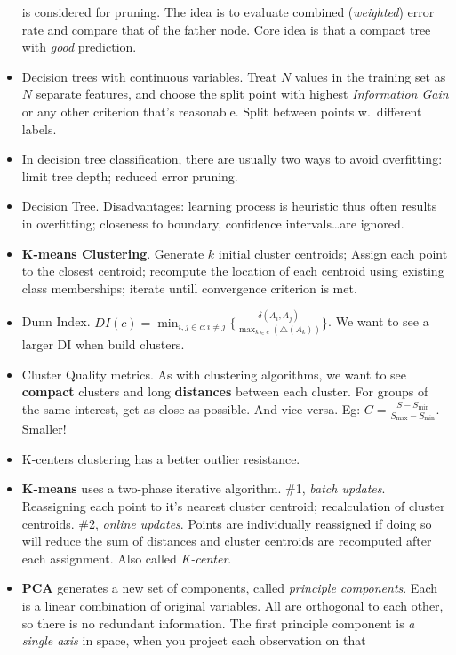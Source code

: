 \documentclass[twocolumn]{article}
\begin{document}
\begin{itemize}
  is considered for pruning. The idea is to evaluate combined
  (\emph{weighted}) error rate and compare that of the father
  node. Core idea is that a compact tree with \emph{good} prediction.
\item Decision trees with continuous variables. Treat $N$ values in
  the training set as $N$ separate features, and choose the split
  point with highest \emph{Information Gain} or any other criterion
  that's reasonable. Split between points w.\ different labels.
\item In decision tree classification, there are usually two ways to
  avoid overfitting: limit tree depth; reduced error pruning.
\item Decision Tree. Disadvantages: learning process is heuristic thus
  often results in overfitting; closeness to boundary, confidence
  intervals\ldots are ignored.
\item \textbf{K-means Clustering}. Generate $k$ initial cluster
  centroids; Assign each point to the closest centroid; recompute the
  location of each centroid using existing class memberships; iterate
  untill convergence criterion is met.
\item Dunn Index. $DI(c)=\min_{i,j\in c:i\neq j}\{\frac{\delta
    (A_{i},A_{j})}{\max_{k\in c}(\triangle (A_{k}))}\}$. We want to
  see a larger DI when build clusters.
\item Cluster Quality metrics. As with clustering algorithms, we want
  to see \textbf{compact} clusters and long \textbf{distances} between
  each cluster. For groups of the same interest, get as close as
  possible. And vice versa. Eg:
  $C=\frac{S-S_{\min}}{S_{\max}-S_{\min}}$. Smaller!
\item K-centers clustering has a better outlier resistance. 
\item \textbf{K-means} uses a two-phase iterative algorithm. \#1,
  \emph{batch updates}. Reassigning each point to it's nearest cluster
  centroid; recalculation of cluster centroids. \#2, \emph{online
    updates}. Points are individually reassigned if doing so will
  reduce the sum of distances and cluster centroids are recomputed
  after each assignment. Also called \emph{K-center}.
\item \textbf{PCA} generates a new set of components, called
  \emph{principle components}. Each is a linear combination of
  original variables. All are orthogonal to each other, so there is no
  redundant information. The first principle component is \emph{a
    single axis} in space, when you project each observation on that

\end{itemize}
\end{document}

